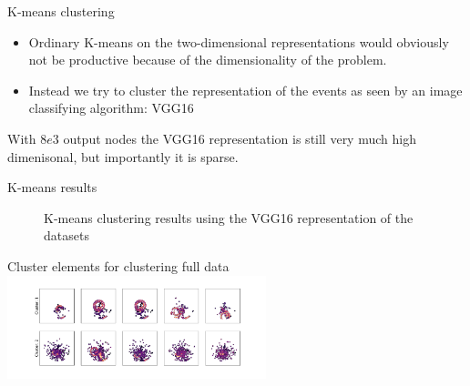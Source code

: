 \documentclass[notes]{beamer}
\begin{document}

\begin{frame}[t]{K-means clustering}
	\begin{itemize}
		\item Ordinary K-means on the two-dimensional representations would obviously not be productive because of the dimensionality of the problem.
		\item Instead we try to cluster the representation of the events as seen by an image classifying algorithm: VGG16
	\end{itemize}

	With $8e3$ output nodes the VGG16 representation is still very much high dimenisonal, but importantly it is sparse.
\end{frame}

\begin{frame}[t]{K-means results}
	\begin{figure}[h]
		\centering
		\caption{K-means clustering results using the VGG16 representation of the datasets}
	\end{figure}
	Cluster elements for clustering full data 
	\centering 
	\includegraphics[height=3cm]{../chapters/results/clustering/plots/full_vgg_cluster_repr.pdf}
\end{frame}
\end{document}
